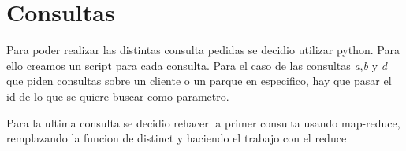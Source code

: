 \section{Consultas}

\par Para poder realizar las distintas consulta pedidas se decidio utilizar python. Para ello creamos un script para cada consulta. Para el caso de las consultas \textit{a},\textit{b} y \textit{d} que piden consultas sobre un cliente o un parque en especifico, hay que pasar el id de lo que se quiere buscar como parametro.

\par Para la ultima consulta se decidio rehacer la primer consulta usando map-reduce, remplazando la funcion de distinct y haciendo el trabajo con el reduce